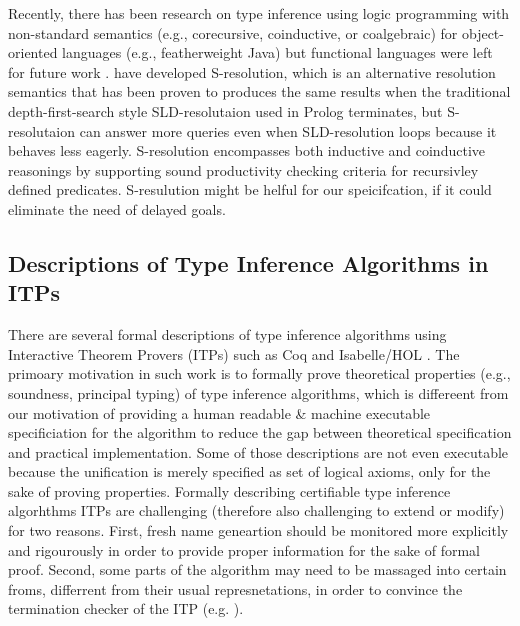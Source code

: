 Recently, there has been research on type inference using logic programming
with non-standard semantics (e.g., corecursive, coinductive, or coalgebraic)
for object-oriented languages (e.g., featherweight Java) but
functional languages were left for future work \cite{AL-ECOOP09}.
\citet{SRLP15} have developed S-resolution, which is an alternative resolution
semantics that has been proven \cite{PCR15} to produces the same results when
the traditional depth-first-search style SLD-resolutaion used in Prolog
terminates, but S-resolutaion can answer more queries even when SLD-resolution
loops because it behaves less eagerly. S-resolution encompasses both inductive
and coinductive reasonings by supporting sound productivity checking criteria
for recursivley defined predicates. S-resulution might be helful for
our speicifcation, if it could eliminate the need of delayed goals.

\subsection{Descriptions of Type Inference Algorithms in ITPs}
There are several formal descriptions of type inference algorithms using
Interactive Theorem Provers (ITPs) such as Coq \cite{Dubois00} and
Isabelle/HOL \cite{NaraschewskiN-JAR,UrbanN2009}. The primoary motivation
in such work is to formally prove theoretical properties (e.g., soundness,
principal typing) of type inference algorithms, which is differeent from
our motivation of providing a human readable \& machine executable
specificiation for the algorithm to reduce the gap between
theoretical specification and practical implementation. Some of those
descriptions  are not even executable because the unification is merely
specified as set of logical axioms, only for the sake of proving properties.
Formally describing certifiable type inference algorhthms ITPs are challenging
(therefore also challenging to extend or modify) for two reasons. First, fresh
name geneartion should be monitored more explicitly and rigourously in order to
provide proper information for the sake of formal proof. Second, some parts of
the algorithm may need to be massaged into certain froms, differrent from their
usual represnetations, in order to convince the termination checker of the ITP
(e.g. \cite{JFP:185139}).

